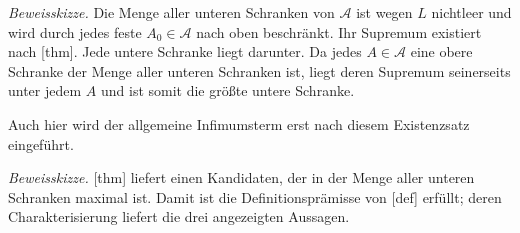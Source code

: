 \documentclass[main.tex]{subfiles}
\begin{document}

\emph{Beweisskizze.}
Die Menge aller unteren Schranken von \(\mathcal A\) ist wegen \(L\)
nichtleer und wird durch jedes feste \(A_0\in\mathcal A\) nach oben
beschränkt. Ihr Supremum existiert nach
[thm]. Jede untere Schranke liegt
darunter. Da jedes \(A\in\mathcal A\) eine obere Schranke der Menge aller
unteren Schranken ist, liegt deren Supremum seinerseits unter jedem \(A\) und
ist somit die größte untere Schranke.

Auch hier wird der allgemeine Infimumsterm erst nach diesem Existenzsatz
eingeführt.


\emph{Beweisskizze.}
[thm] liefert einen Kandidaten,
der in der Menge aller unteren Schranken maximal ist. Damit ist die
Definitionsprämisse von [def] erfüllt; deren
Charakterisierung liefert die drei angezeigten Aussagen.
\end{document}
